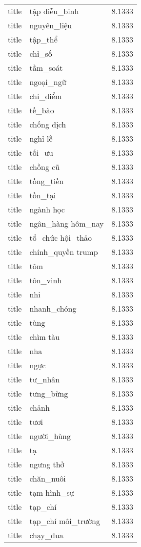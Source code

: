 \documentclass{article}
\begin{document}
\begin{tabular}{lll}
title & tập diễu\_binh & 8.1333\\
title & nguyên\_liệu & 8.1333\\
title & tập\_thể & 8.1333\\
title & chỉ\_số & 8.1333\\
title & tầm\_soát & 8.1333\\
title & ngoại\_ngữ & 8.1333\\
title & chỉ\_điểm & 8.1333\\
title & tế\_bào & 8.1333\\
title & chống dịch & 8.1333\\
title & nghỉ lễ & 8.1333\\
title & tối\_ưu & 8.1333\\
title & chồng cũ & 8.1333\\
title & tống\_tiền & 8.1333\\
title & tồn\_tại & 8.1333\\
title & ngành học & 8.1333\\
title & ngân\_hàng hôm\_nay & 8.1333\\
title & tổ\_chức hội\_thảo & 8.1333\\
title & chính\_quyền trump & 8.1333\\
title & tôm & 8.1333\\
title & tôn\_vinh & 8.1333\\
title & nhi & 8.1333\\
title & nhanh\_chóng & 8.1333\\
title & tùng & 8.1333\\
title & chìm tàu & 8.1333\\
title & nha & 8.1333\\
title & ngực & 8.1333\\
title & tư\_nhân & 8.1333\\
title & tưng\_bừng & 8.1333\\
title & chảnh & 8.1333\\
title & tươi & 8.1333\\
title & người\_hùng & 8.1333\\
title & tạ & 8.1333\\
title & ngưng thở & 8.1333\\
title & chăn\_nuôi & 8.1333\\
title & tạm hình\_sự & 8.1333\\
title & tạp\_chí & 8.1333\\
title & tạp\_chí môi\_trường & 8.1333\\
title & chạy\_đua & 8.1333\\

\end{tabular}
\end{document}
